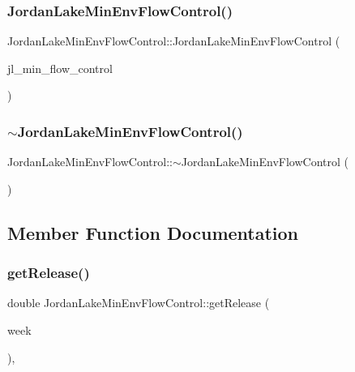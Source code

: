 \subsubsection{\texorpdfstring{Jordan\+Lake\+Min\+Env\+Flow\+Control()}{JordanLakeMinEnvFlowControl()}\hspace{0.1cm}{\footnotesize\ttfamily [2/2]}}
{\footnotesize\ttfamily Jordan\+Lake\+Min\+Env\+Flow\+Control\+::\+Jordan\+Lake\+Min\+Env\+Flow\+Control (\begin{DoxyParamCaption}\item[{const \mbox{\hyperlink{classJordanLakeMinEnvFlowControl}{Jordan\+Lake\+Min\+Env\+Flow\+Control}} \&}]{jl\+\_\+min\+\_\+flow\+\_\+control }\end{DoxyParamCaption})}

\mbox{\label{classJordanLakeMinEnvFlowControl_a97c9cefc5e56d0bee8075a7c1616143e}} 
\subsubsection{\texorpdfstring{$\sim$\+Jordan\+Lake\+Min\+Env\+Flow\+Control()}{~JordanLakeMinEnvFlowControl()}}
{\footnotesize\ttfamily Jordan\+Lake\+Min\+Env\+Flow\+Control\+::$\sim$\+Jordan\+Lake\+Min\+Env\+Flow\+Control (\begin{DoxyParamCaption}{ }\end{DoxyParamCaption})\hspace{0.3cm}{\ttfamily [override]}}



\subsection{Member Function Documentation}
\mbox{\label{classJordanLakeMinEnvFlowControl_a5c2456c26fa141824c247cd15bf5c57d}} 
\subsubsection{\texorpdfstring{get\+Release()}{getRelease()}}
{\footnotesize\ttfamily double Jordan\+Lake\+Min\+Env\+Flow\+Control\+::get\+Release (\begin{DoxyParamCaption}\item[{int}]{week }\end{DoxyParamCaption})\hspace{0.3cm}{\ttfamily [override]}, {\ttfamily [virtual]}}



